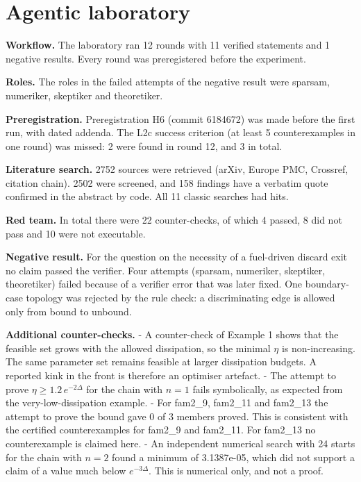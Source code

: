 \documentclass[11pt]{article}
\theoremstyle{definition}\newtheorem{definition}[theorem]{Definition}\newtheorem{example}[theorem]{Example}
\begin{document}
\appendix

\section{Agentic laboratory}\label{agentic-laboratory}

\textbf{Workflow.} The laboratory ran 12 rounds with 11 verified statements and 1 negative results. Every round was preregistered before the experiment.

\textbf{Roles.} The roles in the failed attempts of the negative result were sparsam, numeriker, skeptiker and theoretiker.

\textbf{Preregistration.} Preregistration H6 (commit 6184672) was made before the first run, with dated addenda. The L2c success criterion (at least 5 counterexamples in one round) was missed: 2 were found in round 12, and 3 in total.

\textbf{Literature search.} 2752 sources were retrieved (arXiv, Europe PMC, Crossref, citation chain). 2502 were screened, and 158 findings have a verbatim quote confirmed in the abstract by code. All 11 classic searches had hits.

\textbf{Red team.} In total there were 22 counter-checks, of which 4 passed, 8 did not pass and 10 were not executable.

\textbf{Negative result.} For the question on the necessity of a fuel-driven discard exit no claim passed the verifier. Four attempts (sparsam, numeriker, skeptiker, theoretiker) failed because of a verifier error that was later fixed. One boundary-case topology was rejected by the rule check: a discriminating edge is allowed only from bound to unbound.

\textbf{Additional counter-checks.}
- A counter-check of Example 1 shows that the feasible set grows with the allowed dissipation, so the minimal \(\eta\) is non-increasing. The same parameter set remains feasible at larger dissipation budgets. A reported kink in the front is therefore an optimiser artefact.
- The attempt to prove \(\eta\ge 1.2\,e^{-2\Delta}\) for the chain with \(n=1\) fails symbolically, as expected from the very-low-dissipation example.
- For fam2\_9, fam2\_11 and fam2\_13 the attempt to prove the bound gave 0 of 3 members proved. This is consistent with the certified counterexamples for fam2\_9 and fam2\_11. For fam2\_13 no counterexample is claimed here.
- An independent numerical search with 24 starts for the chain with \(n=2\) found a minimum of 3.1387e-05, which did not support a claim of a value much below \(e^{-3\Delta}\). This is numerical only, and not a proof.
\end{document}
